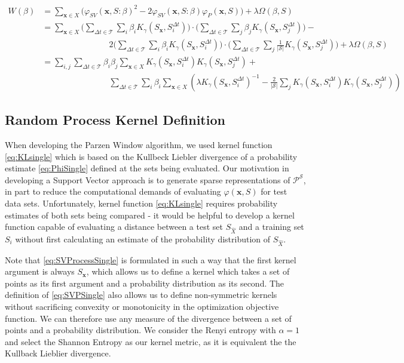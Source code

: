 \documentclass[10pt]{article}
\begin{document}
\begin{align*}
W(\beta) &= \sum_{ \mathbf{x} \in X } \Big( \varphi_{SV}(\mathbf{x},S : \beta)^2 - 2 \varphi_{SV}(\mathbf{x},S : \beta) \varphi_P(\mathbf{x},S)  \Big)  + \lambda \Omega( \beta, S ) \\
&= \sum_{ \mathbf{x} \in X } \Big( \sum_{\Delta t \in \mathcal{T}} \sum_i \beta_i K_\gamma( S_{\mathbf{x}}, S_i^{\Delta t} ) \Big) \cdot \Big( \sum_{\Delta t \in \mathcal{T}} \sum_j \beta_j K_\gamma( S_{\mathbf{x}}, S_j^{\Delta t} ) \Big) - \\
& \qquad \qquad \qquad \qquad 2 \Big( \sum_{\Delta t \in \mathcal{T}} \sum_i \beta_i K_\gamma( S_{\mathbf{x}}, S_i^{\Delta t} ) \Big) \cdot \Big( \sum_{\Delta t \in \mathcal{T}} \sum_j \frac{1}{|\mathcal{S}|} K_\gamma( S_{\mathbf{x}}, S_j^{\Delta t} ) \Big)  + \lambda \Omega( \beta,S ) \\
&= \sum_{i,j} \sum_{\Delta t \in \mathcal{T}} \beta_i \beta_j \sum_{\mathbf{x} \in X} K_\gamma(S_{\mathbf{x}},S_i^{\Delta t}) K_\gamma(S_{\mathbf{x}},S_j^{\Delta t}) + \\
& \qquad \qquad \qquad \qquad \sum_{\Delta t \in \mathcal{T}} \sum_i \beta_i \sum_{\mathbf{x} \in X } \left( \lambda K_\gamma(S_{\mathbf{x}},S_i^{\Delta t})^{-1} - \frac{2}{|\mathcal{S}|} \sum_j K_\gamma(S_{\mathbf{x}},S_i^{\Delta t}) K_\gamma(S_{\mathbf{x}},S_j^{\Delta t}) \right)
\end{align*}

\subsection{  Random Process Kernel Definition }

When developing the Parzen Window algorithm, we used kernel function \ref{eq:KLsingle} which is based on the Kullbeck Liebler divergence of a probability estimate \ref{eq:PhiSingle} defined at the sets being evaluated.  Our motivation in developing a Support Vector approach is to generate sparse representations of \( \mathcal{P}^{\mathcal{S}} \), in part to reduce the computational demands of evaluating \( \varphi( \mathbf{x}, S) \) for test data sets.  Unfortunately, kernel function \ref{eq:KLsingle} requires probability estimates of both sets being compared - it would be helpful to develop a kernel function capable of evaluating a distance between a test set \( S_{\hat{X}} \) and a training set \( S_i \) without first calculating an estimate of the probability distribution of \( S_{\hat{X}} \).

Note that \ref{eq:SVProcessSingle} is formulated in such a way that the first kernel argument is always \( S_{\mathbf{x}} \), which allows us to define a kernel which takes a set of points as its first argument and a probability distribution as its second.  The definition of \ref{eq:SVPSingle} also allows us to define non-symmetric kernels without sacrificing convexity or monotonicity in the optimization objective function.  We can therefore use any measure of the divergence between a set of points and a probability distribution.  We consider the Renyi entropy with \( \alpha = 1 \) and select the Shannon Entropy as our kernel metric, as it is equivalent the the Kullback Lieblier divergence.
\end{document}
